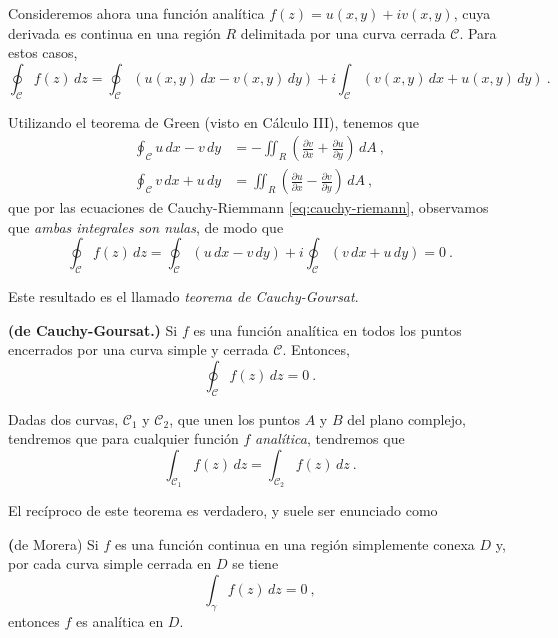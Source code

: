 Consideremos ahora una función analítica $f(z) = u(x,y) + iv(x,y)$, cuya derivada es continua en una región $R$ delimitada por una curva cerrada $\mathcal{C}$. Para estos casos, 
\begin{equation*}
    \oint_{\mathcal{C}} f(z) \, dz = \oint_{\mathcal{C}}(u(x,y) \, dx - v(x,y) \, dy) + i \int_{\mathcal{C}}(v(x,y) \, dx + u(x,y) \, dy) \ .
\end{equation*}

Utilizando el teorema de Green (visto en Cálculo III), tenemos que 
\begin{align}
    \oint_{\mathcal{C}} u \, dx - v \, dy & = - \iint_R \left( \frac{\partial v}{\partial x} + \frac{\partial u}{\partial y} \right) \, dA \ , \\
    \oint_{\mathcal{C}} v \, dx + u \, dy & = \iint_R \left( \frac{\partial u}{\partial x} - \frac{\partial v}{\partial y} \right) \, dA \ ,
\end{align}
que por las ecuaciones de Cauchy-Riemmann \eqref{eq:cauchy-riemann}, observamos que \emph{ambas integrales son nulas}, de modo que 
\begin{equation}
    \oint_\mathcal{C} f(z) \, dz = \oint_{\mathcal{C}} (u \, dx - v \, dy) + i \oint_{\mathcal{C}} (v \, dx + u \, dy) = 0 \ .
\end{equation}

Este resultado es el llamado \emph{teorema de Cauchy-Goursat}.

\begin{teorema}{\textbf{(de Cauchy-Goursat.)}}
    Si $f$ es una función analítica en todos los puntos encerrados por una curva simple y cerrada $\mathcal{C}$. Entonces,
    \begin{equation}
        \oint_\mathcal{C} f(z) \, dz = 0 \ .
    \end{equation}
\end{teorema}

\begin{corolario}
    Dadas dos curvas, $\mathcal{C}_1$ y $\mathcal{C}_2$, que unen los puntos $A$ y $B$ del plano complejo, tendremos que para cualquier función $f$ \emph{analítica}, tendremos que 
    \begin{equation}
        \int_{\mathcal{C}_1} f(z) \, dz = \int_{\mathcal{C}_2} f(z) \, dz \ .
    \end{equation}
\end{corolario}

El recíproco de este teorema es verdadero, y suele ser enunciado como 
\begin{teorema}{\textbf(de Morera)}
    Si $f$ es una función continua en una región simplemente conexa $D$ y, por cada curva simple cerrada en $D$ se tiene 
    \begin{equation*}
        \int_\gamma f(z) \, dz = 0 \ ,
    \end{equation*}
    entonces $f$ es analítica en $D$.
\end{teorema}

